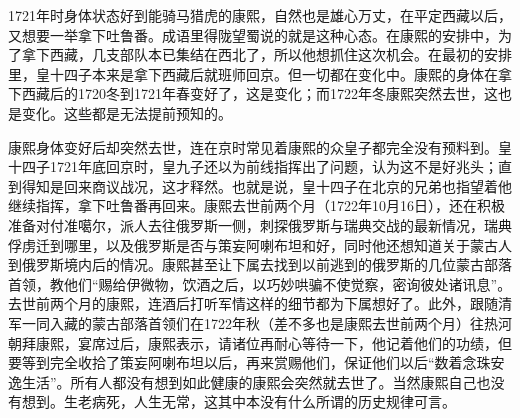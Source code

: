 
1721年时身体状态好到能骑马猎虎的康熙，自然也是雄心万丈，在平定西藏以后，又想要一举拿下吐鲁番。成语里得陇望蜀说的就是这种心态。在康熙的安排中，为了拿下西藏，几支部队本已集结在西北了，所以他想抓住这次机会。在最初的安排里，皇十四子本来是拿下西藏后就班师回京。但一切都在变化中。康熙的身体在拿下西藏后的1720冬到1721年春变好了，这是变化；而1722年冬康熙突然去世，这也是变化。这些都是无法提前预知的。



康熙身体变好后却突然去世，连在京时常见着康熙的众皇子都完全没有预料到。皇十四子1721年底回京时，皇九子还以为前线指挥出了问题，认为这不是好兆头；直到得知是回来商议战况，这才释然。也就是说，皇十四子在北京的兄弟也指望着他继续指挥，拿下吐鲁番再回来。康熙去世前两个月（1722年10月16日），还在积极准备对付准噶尔，派人去往俄罗斯一侧，刺探俄罗斯与瑞典交战的最新情况，瑞典俘虏迁到哪里，以及俄罗斯是否与策妄阿喇布坦和好，同时他还想知道关于蒙古人到俄罗斯境内后的情况。康熙甚至让下属去找到以前逃到的俄罗斯的几位蒙古部落首领，教他们“赐给伊微物，饮酒之后，以巧妙哄骗不使觉察，密询彼处诸讯息”。去世前两个月的康熙，连酒后打听军情这样的细节都为下属想好了。此外，跟随清军一同入藏的蒙古部落首领们在1722年秋（差不多也是康熙去世前两个月）往热河朝拜康熙，宴席过后，康熙表示，请诸位再耐心等待一下，他记着他们的功绩，但要等到完全收拾了策妄阿喇布坦以后，再来赏赐他们，保证他们以后“数着念珠安逸生活”。所有人都没有想到如此健康的康熙会突然就去世了。当然康熙自己也没有想到。生老病死，人生无常，这其中本没有什么所谓的历史规律可言。


